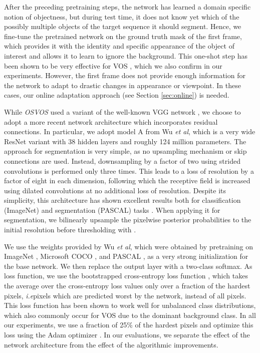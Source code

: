 \documentclass{bmvc2k}
\newcommand{\methodname}[1]{\mbox{\emph{#1}}}
\def\etal{\emph{et al}\bmvaOneDot}
\def\ie{\emph{i.e}\bmvaOneDot}
\newcommand{\PAR}[1]{\vskip4pt \noindent {\bf #1~}}
\begin{document}
\PAR{Test Network.}
After the preceding pretraining steps, the network has learned a domain specific notion of objectness, but during test time, it does not know yet which of the possibly multiple objects of the target sequence it should segment. Hence, we fine-tune the pretrained network on the ground truth mask of the first frame, which provides it with the identity and specific appearance of the object of interest and allows it to learn to ignore the background.
This one-shot step has been shown to be very effective for VOS \cite{OSVOS}, which we also confirm in our experiments. However, the first frame does not provide enough information for the network to adapt to drastic changes in appearance or viewpoint. In these cases, our online adaptation approach (see Section \ref{sec:online}) is needed.

\PAR{Network Architecture.}
While \methodname{OSVOS} used a variant of the well-known VGG network \cite{VGG}, we choose to adopt a more recent network architecture which incorporates residual connections. In particular, we adopt model A from Wu \etal \cite{widerordeeper}, which is a very wide ResNet \cite{resnet} variant with 38 hidden layers and roughly 124 million parameters. The approach for segmentation is very simple, as no upsampling mechanism or skip connections are used. Instead, downsampling by a factor of two using strided convolutions is performed only three times. This leads to a loss of resolution by a factor of eight in each dimension, following which the receptive field is increased using dilated convolutions \cite{Yu16ICLR} at no additional loss of resolution. Despite its simplicity, this architecture has shown excellent results both for classification (ImageNet) and segmentation (PASCAL) tasks \cite{widerordeeper}.
When applying it for segmentation, we bilinearly upsample the pixelwise posterior probabilities to the initial resolution before thresholding with .


We use the weights provided by Wu \etal \cite{widerordeeper}, which were obtained by pretraining on ImageNet \cite{imagenet}, Microsoft COCO \cite{coco}, and PASCAL \cite{pascalVOC}, as a very strong initialization for the base network. We then replace the output layer with a two-class softmax. As loss function, we use the bootstrapped cross-entropy loss function \cite{bootstrappedCE}, which takes the average over the cross-entropy loss values only over a fraction of the hardest pixels, \ie pixels which are predicted worst by the network, instead of all pixels. This loss function has been shown to work well for unbalanced class distributions, which also commonly occur for VOS due to the dominant background class. In all our experiments, we use a fraction of 25\% of the hardest pixels and optimize this loss using the Adam optimizer \cite{adam}. In our evaluations, we separate the effect of the network architecture from the effect of the algorithmic improvements.
\end{document}
